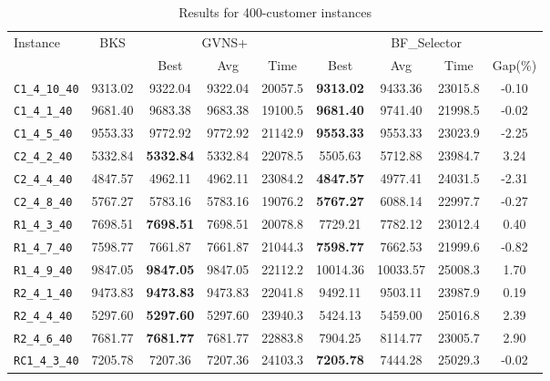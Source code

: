 \begin{table}[ht]
\centering
\small
\setlength{\tabcolsep}{5pt}
\caption{Results for 400-customer instances}
\vspace{4mm}
\begin{adjustbox}{width=\textwidth}
\begin{tabular}{l c c c c @{\hspace{8pt}} c c c c @{\hspace{8pt}}}
\toprule
\multirow{2}{*}{Instance} & \multirow{2}{*}{BKS} & \multicolumn{3}{c}{GVNS+} & \multicolumn{4}{c}{BF\_Selector} \\
\cmidrule(lr){3-5} \cmidrule(lr){6-9}
 &  & Best & Avg & Time & Best & Avg & Time & Gap(\%) \\
\midrule
\texttt{C1\_4\_10\_40} & 9313.02 & 9322.04 & 9322.04 & 20057.5 & \textbf{9313.02} & 9433.36 & 23015.8 & -0.10 \\
\texttt{C1\_4\_1\_40} & 9681.40 & 9683.38 & 9683.38 & 19100.5 & \textbf{9681.40} & 9741.40 & 21998.5 & -0.02 \\
\texttt{C1\_4\_5\_40} & 9553.33 & 9772.92 & 9772.92 & 21142.9 & \textbf{9553.33} & 9553.33 & 23023.9 & -2.25 \\
\texttt{C2\_4\_2\_40} & 5332.84 & \textbf{5332.84} & 5332.84 & 22078.5 & 5505.63 & 5712.88 & 23984.7 & 3.24 \\
\texttt{C2\_4\_4\_40} & 4847.57 & 4962.11 & 4962.11 & 23084.2 & \textbf{4847.57} & 4977.41 & 24031.5 & -2.31 \\
\texttt{C2\_4\_8\_40} & 5767.27 & 5783.16 & 5783.16 & 19076.2 & \textbf{5767.27} & 6088.14 & 22997.7 & -0.27 \\
\texttt{R1\_4\_3\_40} & 7698.51 & \textbf{7698.51} & 7698.51 & 20078.8 & 7729.21 & 7782.12 & 23012.4 & 0.40 \\
\texttt{R1\_4\_7\_40} & 7598.77 & 7661.87 & 7661.87 & 21044.3 & \textbf{7598.77} & 7662.53 & 21999.6 & -0.82 \\
\texttt{R1\_4\_9\_40} & 9847.05 & \textbf{9847.05} & 9847.05 & 22112.2 & 10014.36 & 10033.57 & 25008.3 & 1.70 \\
\texttt{R2\_4\_1\_40} & 9473.83 & \textbf{9473.83} & 9473.83 & 22041.8 & 9492.11 & 9503.11 & 23987.9 & 0.19 \\
\texttt{R2\_4\_4\_40} & 5297.60 & \textbf{5297.60} & 5297.60 & 23940.3 & 5424.13 & 5459.00 & 25016.8 & 2.39 \\
\texttt{R2\_4\_6\_40} & 7681.77 & \textbf{7681.77} & 7681.77 & 22883.8 & 7904.25 & 8114.77 & 23005.7 & 2.90 \\
\texttt{RC1\_4\_3\_40} & 7205.78 & 7207.36 & 7207.36 & 24103.3 & \textbf{7205.78} & 7444.28 & 25029.3 & -0.02 \\

\end{tabular}
\end{adjustbox}
\end{table}
